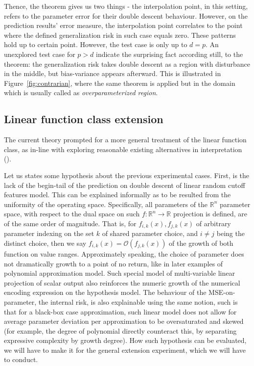 \documentclass[10pt]{article} %
\begin{document}
Thence, the theorem gives us two things - the interpolation point, in this setting, refers to the parameter error for their double descent behaviour. However, on the prediction results' error measure, the interpolation point correlates to the point where the defined generalization risk in such case equals zero. These patterns hold up to certain point. However, the test case is only up to $d=p$. An unexplored test case for $p>d$ indicate the surprising fact according still, to the theorem: the generalization risk takes double descent as a region with disturbance in the middle, but bias-variance appears afterward. This is illustrated in Figure~\ref{fig:contrarian}, where the same theorem is applied but in the domain which is usually called as \textit{overparameterized region}. 
\subsection{Linear function class extension}

The current theory prompted for a more general treatment of the linear function class, as in-line with exploring reasonable existing alternatives in interpretation (\cite{nakkiran2019datahurtlinearregression}).

Let us states some hypothesis about the previous experimental cases. First, is the lack of the begin-tail of the prediction on double descent of linear random cutoff features model. This can be explained informally as to be resulted from the uniformity of the operating space. Specifically, all parameters of the $\mathbb{R}^{n}$ parameter space, with respect to the dual space on such $f:\mathbb{R}^{n}\to\mathbb{R}$ projection is defined, are of the same order of magnitude. That is, for $f_{i,k}(x),f_{j,k}(x)$ of arbitrary parameter indexing on the set $k$ of shared parameter choice, and $i\neq j$ being the distinct choice, then we say $f_{i,k}(x)=\mathcal{O}(f_{j,k}(x))$ of the growth of both function on value ranges. Approximately speaking, the choice of parameter does not dramatically growth to a point of no return, like in later examples of polynomial approximation model. Such special model of multi-variable linear projection of scalar output also reinforces the numeric growth of the numerical encoding expression on the hypothesis model. The behaviour of the MSE-on-parameter, the internal risk, is also explainable using the same notion, such is that for a black-box case approximation, such linear model does not allow for average parameter deviation per approximation to be oversaturated and skewed (for example, the degree of polynomial directly counteract this, by separating expressive complexity by growth degree). How such hypothesis can be evaluated, we will have to make it for the general extension experiment, which we will have to conduct. 
\end{document}
